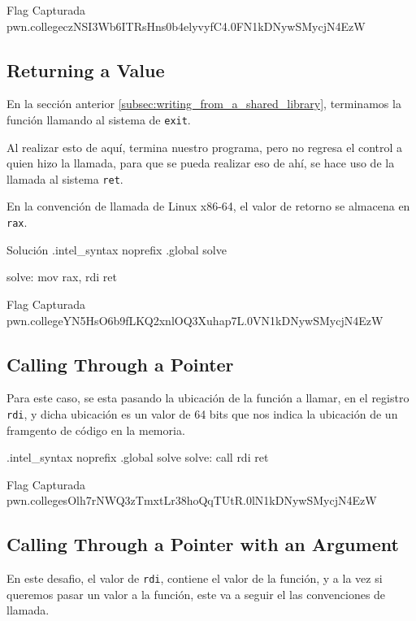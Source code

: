 \begin{flagbox}{Flag Capturada}
	pwn.college{czNSI3Wb6ITRsHns0b4elyvyfC4.0FN1kDNywSMycjN4EzW}
\end{flagbox}

\subsection{Returning a Value} \label{subsec:returning_a_value}

En la sección anterior \ref{subsec:writing_from_a_shared_library},
terminamos la función llamando al sistema de \texttt{exit}.

Al realizar esto de aquí, termina nuestro programa, pero no regresa el control a quien hizo la llamada,
para que se pueda realizar eso de ahí, se hace uso de la llamada al sistema \texttt{ret}.

En la convención de llamada de Linux x86-64, el valor de retorno se almacena en \texttt{rax}.
\begin{codebox}[ASM]{Solución}
	.intel_syntax noprefix
	.global solve

	solve:
	mov rax, rdi
	ret
\end{codebox}

\begin{flagbox}{Flag Capturada}
	pwn.college{YN5HsO6b9fLKQ2xnlOQ3Xuhap7L.0VN1kDNywSMycjN4EzW}
\end{flagbox}

\subsection{Calling Through a Pointer} \label{subsec:calling_through_a_pointer}

Para este caso, se esta pasando la ubicación de la función a llamar, en el registro
\texttt{rdi}, y dicha ubicación es un valor de 64 bits que nos indica la
ubicación de un framgento de código en la memoria.

\begin{codebox}[ASM]{}
	.intel_syntax noprefix
	.global solve
	solve:
	call rdi
	ret
\end{codebox}

\begin{flagbox}{Flag Capturada}
	pwn.college{sOlh7rNWQ3zTmxtLr38hoQqTUtR.0lN1kDNywSMycjN4EzW}
\end{flagbox}
\subsection{Calling Through a Pointer with an Argument} \label{subsec:calling_through_a_pointer_with_an_argument}
En este desafio, el valor de \texttt{rdi}, contiene el valor
de la función, y a la vez si queremos pasar un valor a la función, este va a seguir
el las convenciones de llamada.

